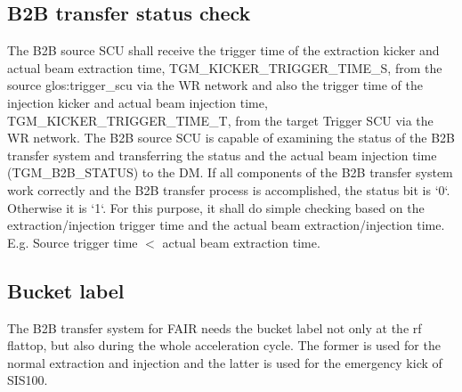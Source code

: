 \subsection{B2B transfer status check}
The B2B source SCU shall receive the trigger time of the extraction kicker and actual beam extraction time, TGM\_KICKER\_TRIGGER\_TIME\_S, from the source \gls{glos:trigger_scu} via the WR network and also the trigger time of the injection kicker and actual beam injection time, TGM\_KICKER\_TRIGGER\_TIME\_T, from the target Trigger SCU via the WR network. The B2B source SCU is capable of examining the status of the B2B transfer system and transferring the status and the actual beam injection time  (TGM\_B2B\_STATUS) to the DM. If all components of the B2B transfer system work correctly and the B2B transfer process is accomplished, the status bit is `0`. Otherwise it is `1`. For this purpose, it shall do simple checking based on the extraction/injection trigger time and the actual beam extraction/injection time. E.g. Source trigger time $<$ actual beam extraction time.










\subsection{Bucket label}
The B2B transfer system for FAIR needs the bucket label not only at the rf flattop, but also during the whole acceleration cycle. The former is used for the normal extraction and injection and the latter is used for the emergency kick of SIS100. 

